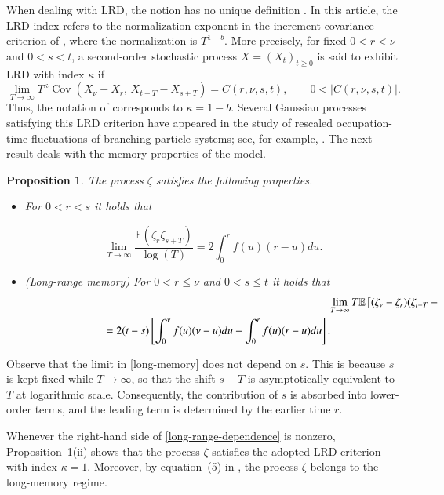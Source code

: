 \documentclass[preprint,12pt,authoryear]{elsarticle}
\def\E{\mathbb{E}}
\newtheorem{prop}{Proposition}
\begin{document}
When dealing with LRD, the notion has no unique definition
\citet{samo}. In this article, the LRD index refers to the
normalization exponent in the increment-covariance criterion of
\citet[Theorem~2.4(5)]{BGT2007}, where the normalization is
\(T^{1-b}\). More precisely, for fixed \(0<r<\nu\) and \(0<s<t\),
a second-order stochastic process \(X=(X_t)_{t\geq0}\) is said to
exhibit LRD with index \(\kappa\) if
\[
\lim_{T\to\infty}
T^{\kappa}
\operatorname{Cov}\!\left(
X_{\nu}-X_r,\,
X_{t+T}-X_{s+T}
\right)
=
C(r,\nu,s,t),
\qquad
0<\left|C(r,\nu,s,t)\right|.
\]
Thus, the notation of \citet[Theorem~2.4(5)]{BGT2007} corresponds
to \(\kappa=1-b\). Several Gaussian processes satisfying this LRD
criterion have appeared in the study of rescaled occupation-time
fluctuations of branching particle systems; see, for example,
\cite{BGT-SPL2004,BGT2007,BGT2008,LMR2024}. The next result deals
with the memory properties of the model.
\begin{prop}\label{LRM}  The process $\zeta$ satisfies the following properties. 
\begin{itemize}
\item[(i)]  For $0<r<s$ it holds that 

\begin{equation}\label{long-memory}
    \lim_{T\rightarrow\infty}\frac{\E(\zeta_r \zeta_{s+T})}{\log(T)} =2\int_0^r f(u)(r-u) du.  
\end{equation}
\item[(ii)] (Long-range memory) For $0<r\leq \nu$ and $0<s\leq t$ it holds that 
\begin{eqnarray}\label{long-range-dependence}
  &&\lefteqn{ \lim_{T\rightarrow\infty} T\E\left[(\zeta_\nu-\zeta_r)(\zeta_{t+T}-\zeta_{s+T})\right]}\nonumber\\&&=2(t-s)\left[\int_0^\nu f(u)(\nu-u)du-\int_0^r f(u)(r-u)du\right].
\end{eqnarray}

\end{itemize}
\end{prop}

Observe that the limit in \eqref{long-memory} does not depend on \(s\). This is because \(s\) is kept fixed while \(T\to\infty\), so that the shift \(s+T\) is asymptotically equivalent to \(T\) at logarithmic scale. Consequently, the contribution of \(s\) is absorbed into lower-order terms, and the leading term is determined by the earlier time \(r\).

Whenever the right-hand side of
\eqref{long-range-dependence} is nonzero,
Proposition~\ref{LRM}(ii) shows that the process \(\zeta\)
satisfies the adopted LRD criterion with index \(\kappa=1\).
Moreover, by equation~(5) in \cite{Gorostiza2015}, the process
\(\zeta\) belongs to the long-memory regime.
\end{document}
